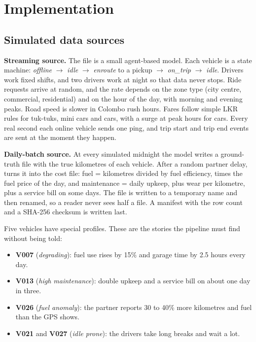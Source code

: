 \section{Implementation}

\subsection{Simulated data sources}
\label{sec:sources}
\textbf{Streaming source.} The file  is a small agent-based model. Each vehicle is a
state machine: \emph{offline} $\rightarrow$ \emph{idle} $\rightarrow$ \emph{enroute} to a pickup
$\rightarrow$ \emph{on\_trip} $\rightarrow$ \emph{idle}. Drivers work fixed shifts, and two drivers work at
night so that data never stops. Ride requests arrive at random, and the rate depends on the zone type (city
centre, commercial, residential) and on the hour of the day, with morning and evening peaks. Road speed is
slower in Colombo rush hours. Fares follow simple LKR rules for tuk-tuks, mini cars and cars, with a surge
at peak hours for cars. Every real second each online vehicle sends one ping, and trip start and trip end
events are sent at the moment they happen.

\textbf{Daily-batch source.} At every simulated midnight the model writes a ground-truth file with the true
kilometres of each vehicle. After a random partner delay,  turns it into the cost
file: fuel = kilometres divided by fuel efficiency, times the fuel price of the day, and maintenance = daily
upkeep, plus wear per kilometre, plus a service bill on some days. The file is written to a temporary name
and then renamed, so a reader never sees half a file. A manifest with the row count and a SHA-256 checksum is
written last.

Five vehicles have special profiles. These are the stories the pipeline must find without being told:
\begin{itemize}
\item \textbf{V007} (\emph{degrading}): fuel use rises by 15\% and garage time by 2.5 hours every day.
\item \textbf{V013} (\emph{high maintenance}): double upkeep and a service bill on about one day in three.
\item \textbf{V026} (\emph{fuel anomaly}): the partner reports 30 to 40\% more kilometres and fuel than the GPS shows.
\item \textbf{V021} and \textbf{V027} (\emph{idle prone}): the drivers take long breaks and wait a lot.
\end{itemize}

